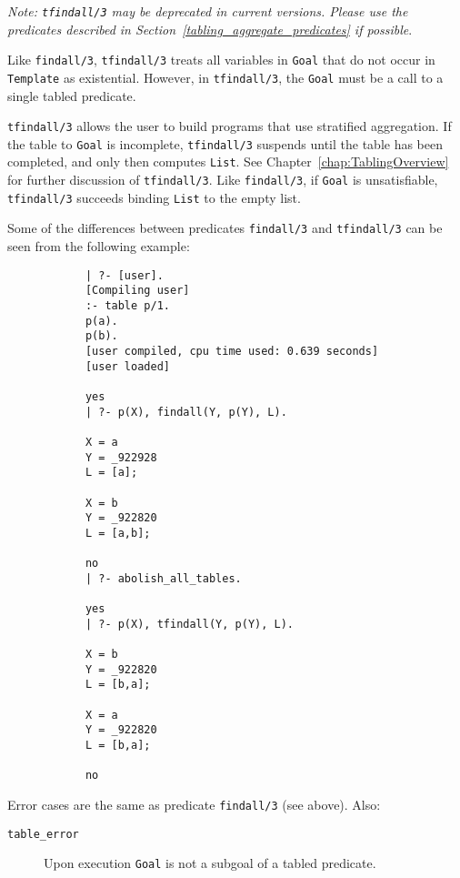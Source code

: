\begin{description}
    {\em Note: {\tt tfindall/3} may be deprecated in current versions.
    Please use the predicates described in
    Section~\ref{tabling_aggregate_predicates} if possible}.

    Like {\tt findall/3}, {\tt tfindall/3} treats all variables in
    {\tt Goal} that do not occur in {\tt Template} as existential.  However,
    in {\tt tfindall/3}, the {\tt Goal} must be a call to a single
    tabled predicate.
	
    {\tt tfindall/3} allows the user to build programs that use
    stratified aggregation.  If the table to {\tt Goal} is incomplete,
    {\tt tfindall/3} suspends until the table has been completed, and
    only then computes {\tt List}.  See Chapter~\ref{chap:TablingOverview}
    for further discussion of {\tt tfindall/3}.  Like {\tt findall/3},
    if {\tt Goal} is unsatisfiable, {\tt tfindall/3} succeeds binding
    {\tt List} to the empty list.

    Some of the differences between predicates {\tt findall/3} and
    {\tt tfindall/3} can be seen from the following example:

    {\footnotesize
    \begin{verbatim}
            | ?- [user].
            [Compiling user]
            :- table p/1.
            p(a).
            p(b).
            [user compiled, cpu time used: 0.639 seconds]
            [user loaded]

            yes
            | ?- p(X), findall(Y, p(Y), L).

            X = a
            Y = _922928
            L = [a];

            X = b
            Y = _922820
            L = [a,b];

            no
            | ?- abolish_all_tables.

            yes
            | ?- p(X), tfindall(Y, p(Y), L).

            X = b
            Y = _922820
            L = [b,a];

            X = a
            Y = _922820
            L = [b,a];

            no
    \end{verbatim}
    }

    Error cases are the same as predicate {\tt findall/3} (see above).
    Also:
    \begin{description}
    \item[{\tt table\_error}]
	Upon execution {\tt Goal} is not a subgoal of a tabled predicate.
    \end{description}


\end{description}
